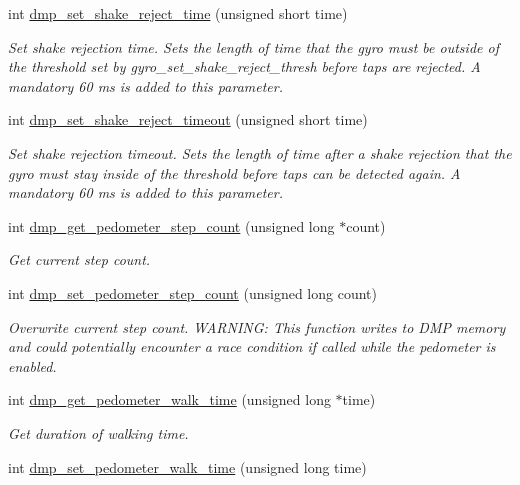 \begin{DoxyCompactItemize}
int \hyperlink{group___d_r_i_v_e_r_s_ga09d7a6d90e1bd2e907f1866d850c5608}{dmp\+\_\+set\+\_\+shake\+\_\+reject\+\_\+time} (unsigned short time)
\begin{DoxyCompactList}\small\item\em Set shake rejection time. Sets the length of time that the gyro must be outside of the threshold set by {\itshape gyro\+\_\+set\+\_\+shake\+\_\+reject\+\_\+thresh} before taps are rejected. A mandatory 60 ms is added to this parameter. \end{DoxyCompactList}\item 
int \hyperlink{group___d_r_i_v_e_r_s_ga5d44d1a32535000e6902cdc5224d1b54}{dmp\+\_\+set\+\_\+shake\+\_\+reject\+\_\+timeout} (unsigned short time)
\begin{DoxyCompactList}\small\item\em Set shake rejection timeout. Sets the length of time after a shake rejection that the gyro must stay inside of the threshold before taps can be detected again. A mandatory 60 ms is added to this parameter. \end{DoxyCompactList}\item 
int \hyperlink{group___d_r_i_v_e_r_s_gad8f4d1a93e0f03d950559501c5a7255b}{dmp\+\_\+get\+\_\+pedometer\+\_\+step\+\_\+count} (unsigned long $\ast$count)
\begin{DoxyCompactList}\small\item\em Get current step count. \end{DoxyCompactList}\item 
int \hyperlink{group___d_r_i_v_e_r_s_ga568562c19998f585b1d2ba056cd209db}{dmp\+\_\+set\+\_\+pedometer\+\_\+step\+\_\+count} (unsigned long count)
\begin{DoxyCompactList}\small\item\em Overwrite current step count. W\+A\+R\+N\+I\+NG\+: This function writes to D\+MP memory and could potentially encounter a race condition if called while the pedometer is enabled. \end{DoxyCompactList}\item 
int \hyperlink{group___d_r_i_v_e_r_s_ga62c8e5e99986b0e60ca0dc9a9b9c3fcc}{dmp\+\_\+get\+\_\+pedometer\+\_\+walk\+\_\+time} (unsigned long $\ast$time)
\begin{DoxyCompactList}\small\item\em Get duration of walking time. \end{DoxyCompactList}\item 
int \hyperlink{group___d_r_i_v_e_r_s_ga62f469269047f8cba16a2b7f5349acc0}{dmp\+\_\+set\+\_\+pedometer\+\_\+walk\+\_\+time} (unsigned long time)

\end{DoxyCompactItemize}
